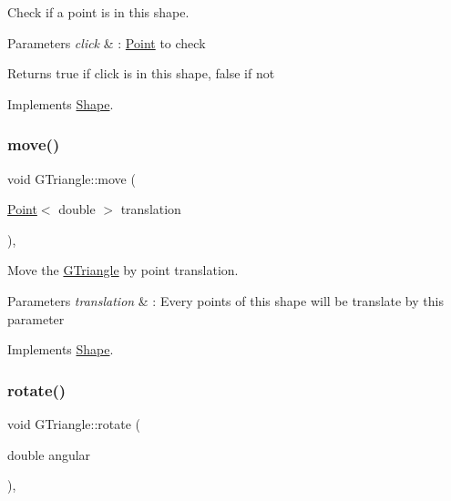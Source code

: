 Check if a point is in this shape. 


\begin{DoxyParams}{Parameters}
{\em click} & \+: \hyperlink{classPoint}{Point} to check \\
\hline
\end{DoxyParams}
\begin{DoxyReturn}{Returns}
true if click is in this shape, false if not 
\end{DoxyReturn}


Implements \hyperlink{classShape_abcce23128cd35989468a88a7194152af}{Shape}.

\mbox{\label{classGTriangle_a89910a7f176743473d3bfd15de01377d}} 
\subsubsection{\texorpdfstring{move()}{move()}}
{\footnotesize\ttfamily void G\+Triangle\+::move (\begin{DoxyParamCaption}\item[{\hyperlink{classPoint}{Point}$<$ double $>$}]{translation }\end{DoxyParamCaption})\hspace{0.3cm}{\ttfamily [override]}, {\ttfamily [virtual]}}



Move the \hyperlink{classGTriangle}{G\+Triangle} by point translation. 


\begin{DoxyParams}{Parameters}
{\em translation} & \+: Every points of this shape will be translate by this parameter \\
\hline
\end{DoxyParams}


Implements \hyperlink{classShape_a52649731b2cb7b67315882d5e005f7e8}{Shape}.

\mbox{\label{classGTriangle_ae3ed75bbad4ba7fed68bc06c5834cfbe}} 
\subsubsection{\texorpdfstring{rotate()}{rotate()}}
{\footnotesize\ttfamily void G\+Triangle\+::rotate (\begin{DoxyParamCaption}\item[{double}]{angular }\end{DoxyParamCaption})\hspace{0.3cm}{\ttfamily [override]}, {\ttfamily [virtual]}}



